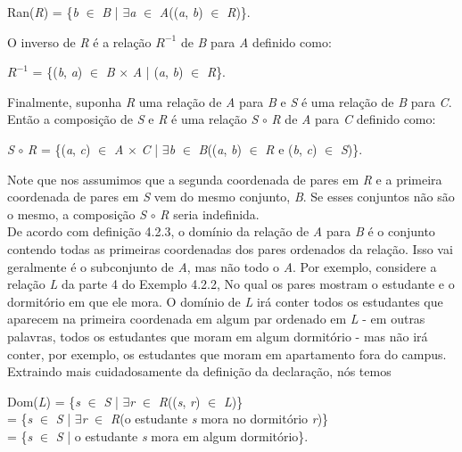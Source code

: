 \begin{center}
Ran(\textit{R}) = \{\textit{b} $\in$ \textit{B} | $\exists$\textit{a} $\in$ \textit{A}((\textit{a}, \textit{b}) $\in$ \textit{R})\}. 
\end{center}
O inverso de \textit{R} é a relação $\textit{R}^{-1}$ de \textit{B} para \textit{A} definido como:

\begin{center}
$\textit{R}^{-1}$ = \{(\textit{b}, \textit{a}) $\in$ \textit{B} $\times$ \textit{A} | (\textit{a}, \textit{b}) $\in$ \textit{R}\}. 
\end{center}

Finalmente, suponha \textit{R} uma relação de \textit{A} para \textit{B} e \textit{S} é uma relação de \textit{B} para \textit{C}.
Então a composição de \textit{S} e \textit{R} é uma relação \textit{S} $\circ$ \textit{R} de \textit{A} para \textit{C} definido 
como:

\begin{center}
\textit{S} $\circ$ \textit{R} = \{(\textit{a}, \textit{c}) $\in$ \textit{A} $\times$ \textit{C} | $\exists$\textit{b} $\in$
\textit{B}((\textit{a}, \textit{b}) $\in$ \textit{R} e (\textit{b}, \textit{c}) $\in$ \textit{S})\}. 
\end{center}

Note que nos assumimos que a segunda coordenada de pares em \textit{R} e a primeira coordenada de pares em \textit{S} vem do mesmo conjunto, \textit{B}. Se esses conjuntos não são o mesmo, a composição \textit{S} $\circ$ \textit{R} seria indefinida.
\\

De acordo com definição 4.2.3, o domínio da relação de \textit{A} para \textit{B} é o conjunto contendo todas as primeiras coordenadas dos pares ordenados da relação. Isso vai geralmente é o subconjunto de \textit{A}, mas não todo o \textit{A}. Por exemplo, considere a relação \textit{L} da parte 4 do Exemplo 4.2.2, No qual os pares mostram o estudante e o dormitório em que ele mora. O domínio de \textit{L} irá conter todos os estudantes que aparecem na primeira coordenada em algum par ordenado em \textit{L} - em outras palavras, todos os estudantes que moram em algum dormitório - mas não irá conter, por exemplo, os estudantes que moram em apartamento fora do campus. Extraindo mais cuidadosamente da definição da declaração, nós temos

\begin{center}
Dom(\textit{L}) = \{\textit{s} $\in$ \textit{S} | $\exists$\textit{r} $\in$ \textit{R}((\textit{s}, \textit{r}) $\in$ \textit{L})\}
\\
= \{\textit{s} $\in$ \textit{S} | $\exists$\textit{r} $\in$ \textit{R}(o estudante \textit{s} mora no dormitório \textit{r})\}
\\
= \{\textit{s} $\in$ \textit{S} | o estudante \textit{s} mora em algum dormitório\}.
\end{center}

